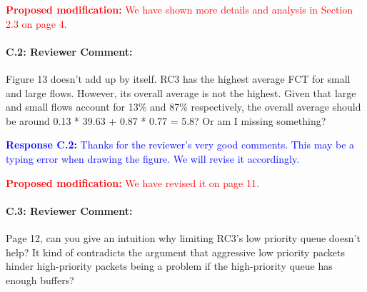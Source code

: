 \documentclass[12pt,one-column]{article}
\begin{document}
\noindent\textcolor{red}{\textbf{Proposed modification: }
We have shown more details and analysis in Section 2.3 on page 4.
}

{\it \paragraph{C.2: Reviewer Comment:} Figure 13 doesn’t add up by itself. RC3 has the highest average FCT for small and large flows. However, its overall average is not the highest. Given that large and small flows account for 13\% and 87\% respectively, the overall average should be around 0.13 * 39.63 + 0.87 * 0.77 = 5.8? Or am I missing something?}


\noindent\textcolor{blue}{\textbf{Response C.2:}
Thanks for the reviewer’s very good comments. 
This may be a typing error when drawing the figure.
We will revise it accordingly.
}

\noindent\textcolor{red}{\textbf{Proposed modification: }
We have revised it on page 11.
}

{\it \paragraph{C.3: Reviewer Comment:} Page 12, can you give an intuition why limiting RC3’s low priority queue doesn’t help? It kind of contradicts the argument that aggressive low priority packets hinder high-priority packets being a problem if the high-priority queue has enough buffers?}
\end{document}
